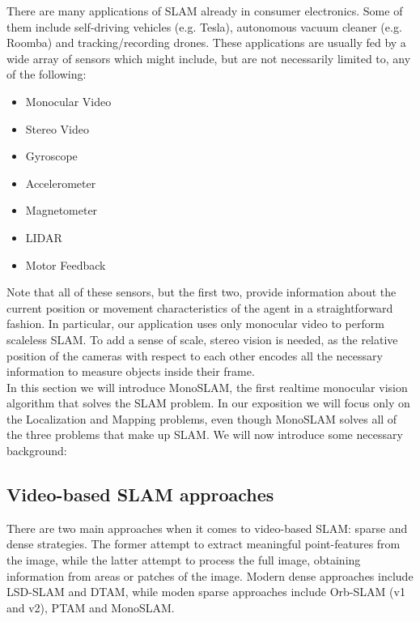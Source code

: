 \documentclass{article}
\begin{document}
There are many applications of SLAM already in consumer electronics. Some of them include self-driving vehicles (e.g. Tesla), autonomous vacuum cleaner (e.g. Roomba) and tracking/recording drones. These applications are usually fed by a wide array of sensors which might include, but are not necessarily limited to, any of the following:

\begin{itemize}
\item Monocular Video
\item Stereo Video
\item Gyroscope
\item Accelerometer
\item Magnetometer
\item LIDAR
\item Motor Feedback
\end{itemize}

Note that all of these sensors, but the first two, provide information about the current position or movement characteristics of the agent in a straightforward fashion. In particular, our application uses only monocular video to perform scaleless SLAM. To add a sense of scale, stereo vision is needed, as the relative position of the cameras with respect to each other encodes all the necessary information to measure objects inside their frame. \\

In this section we will introduce MonoSLAM, the first realtime monocular vision algorithm that solves the SLAM problem. In our exposition we will focus only on the Localization and Mapping problems, even though MonoSLAM solves all of the three problems that make up SLAM. We will now introduce some necessary background: \\

\subsection{Video-based SLAM approaches}

There are two main approaches when it comes to video-based SLAM: sparse and dense strategies. The former attempt to extract meaningful point-features from the image, while the latter attempt to process the full image, obtaining information from areas or patches of the image. Modern dense approaches include LSD-SLAM and DTAM, while moden sparse approaches include Orb-SLAM (v1 and v2), PTAM and MonoSLAM. \\
\end{document}
